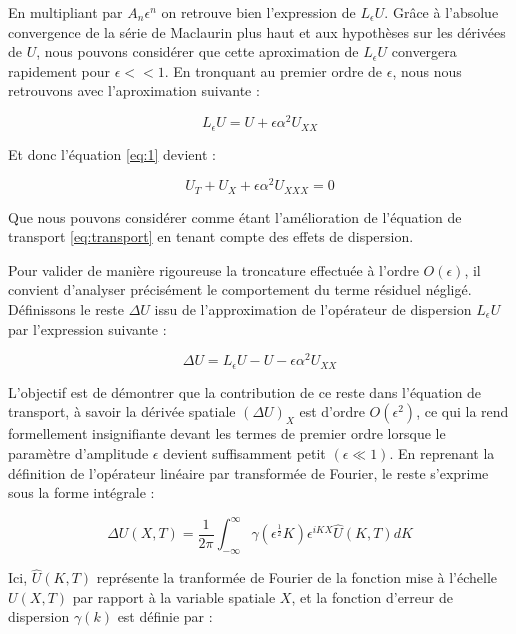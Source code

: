 En multipliant par $A_n \epsilon^n$ on retrouve bien l'expression de $L_\epsilon U$. Grâce à l'absolue convergence de la série de Maclaurin plus haut et aux hypothèses sur les dérivées de $U$, nous pouvons considérer que cette aproximation de $L_\epsilon U$ convergera rapidement pour $\epsilon << 1$. En tronquant au premier ordre de $\epsilon$, nous nous retrouvons avec l'aproximation suivante :

\begin{equation*}
    L_\epsilon U = U + \epsilon \alpha^2 U_{XX}
\end{equation*}

Et donc l'équation \eqref{eq:1} devient :

\begin{equation}
    U_T + U_X + \epsilon \alpha^2 U_{XXX} = 0
\end{equation}

Que nous pouvons considérer comme étant l'amélioration de l'équation de transport \eqref{eq:transport} en tenant compte des effets de dispersion.













Pour valider de manière rigoureuse la troncature effectuée à l'ordre $O(\epsilon)$, il convient d'analyser précisément le comportement du terme résiduel négligé. Définissons le reste $\Delta U$ issu de l'approximation de l'opérateur de dispersion $L_\epsilon U$ par l'expression suivante :

\[
    \Delta U = L_\epsilon U - U - \epsilon \alpha^2 U_{XX}
\]

L'objectif est de démontrer que la contribution de ce reste dans l'équation de transport, à savoir la dérivée spatiale $(\Delta U)_X$ est d'ordre $O(\epsilon^2)$, ce qui la rend formellement insignifiante devant les termes de premier ordre lorsque le paramètre d'amplitude $\epsilon$ devient suffisamment petit $(\epsilon \ll 1)$. En reprenant la définition de l'opérateur linéaire par transformée de Fourier, le reste s'exprime sous la forme intégrale :

\[
    \Delta U(X,T) = \frac{1}{2\pi} \int_{-\infty}^{\infty} \gamma(\epsilon^\frac{1}{2}K)\epsilon^{iKX}\hat{U}(K,T)dK
\]

Ici, $\hat{U}(K,T)$ représente la tranformée de Fourier de la fonction mise à l'échelle $U(X,T)$ par rapport à la variable spatiale $X$, et la fonction d'erreur de dispersion $\gamma(k)$ est définie par :

